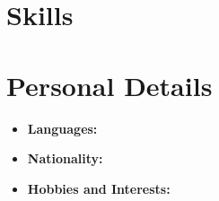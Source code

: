 \documentclass[a4paper,10pt]{article}
\begin{document}
\section*{Skills}
\begin{itemize}
\end{itemize}

\section*{Personal Details}
\begin{itemize}
    \item \textbf{Languages:} 
    \item \textbf{Nationality:} 
    \item \textbf{Hobbies and Interests:} 
\end{itemize}
\end{document}

